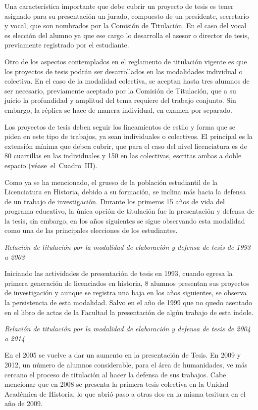 Una característica importante que debe cubrir un proyecto de tesis es tener
asignado para su presentación un jurado, compuesto de un presidente,
secretario y vocal, que son nombrados por la Comisión de Titulación. En el
caso del vocal es elección del alumno ya que ese cargo lo desarrolla el
asesor o director de tesis, previamente registrado por el estudiante.

Otro de los aspectos contemplados en el reglamento de titulación vigente es
que los proyectos de tesis podrán ser desarrollados en las modalidades
individual o colectiva. En el caso de la modalidad colectiva, se aceptan
hasta tres alumnos de ser necesario, previamente aceptado por la Comisión
de Titulación, que a su juicio la profundidad y amplitud del tema requiere
del trabajo conjunto. Sin embargo, la réplica se hace de manera individual,
en examen por separado.

Los proyectos de tesis deben seguir los lineamientos de estilo y forma
que se piden en este tipo de trabajos, ya sean individuales o colectivos.
El principal es la extensión mínima que deben cubrir, que para el caso
del nivel licenciatura es de 80 cuartillas en las individuales y 150 en las
colectivas, escritas ambas a doble espacio (véase~el~Cuadro~III).

Como ya se ha mencionado, el grueso de la población estudiantil de la
Licenciatura en Historia, debido a su formación, se inclina más hacia la
defensa de un trabajo de investigación. Durante los primeros 15 años de
vida del programa educativo, la única opción de titulación fue la
presentación y defensa de la tesis, sin embargo, en los años siguientes se
sigue observando esta modalidad como una de las principales elecciones de
los estudiantes.

\smallskip 
\textit{Relación de titulación por la modalidad de elaboración y defensa de
tesis de 1993 a 2003}
\enlargethispage{1\baselineskip}

\smallskip
Iniciando las actividades de presentación de tesis en 1993, cuando egresa la
primera generación de licenciados en historia,  8 alumnos presentan sus
proyectos de investigación y aunque se registra una baja en los años
siguientes, se observa la persistencia de esta modalidad. Salvo en el año
de 1999 que no quedo asentado en el libro de actas de la Facultad la
presentación de algún trabajo de esta índole.


\smallskip 
\textit{Relación de titulación por la modalidad de elaboración y defensa de
tesis de 2004 a 2014}

\smallskip
En el 2005 se vuelve a dar un aumento en la presentación de Tesis. En 2009 y
2012, un número de alumnos considerable, para el área de humanidades, ve
más cercano el proceso de titulación al hacer la defensa de sus trabajos.
Cabe mencionar que en 2008 se presenta la primera tesis colectiva en la
Unidad Académica de Historia, lo que abrió paso a otras dos en la misma
tesitura en el año de 2009.

